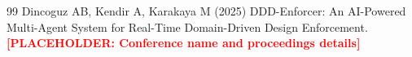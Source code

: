 \documentclass[smallextended]{svjour3}
\newcommand{\placeholder}[1]{\textcolor{red}{\textbf{[PLACEHOLDER: #1]}}}
\begin{document}
\begin{thebibliography}{99}
Dincoguz AB, Kendir A, Karakaya M (2025) DDD-Enforcer: An AI-Powered Multi-Agent System for Real-Time Domain-Driven Design Enforcement. \placeholder{Conference name and proceedings details}


\end{thebibliography}
\end{document}
